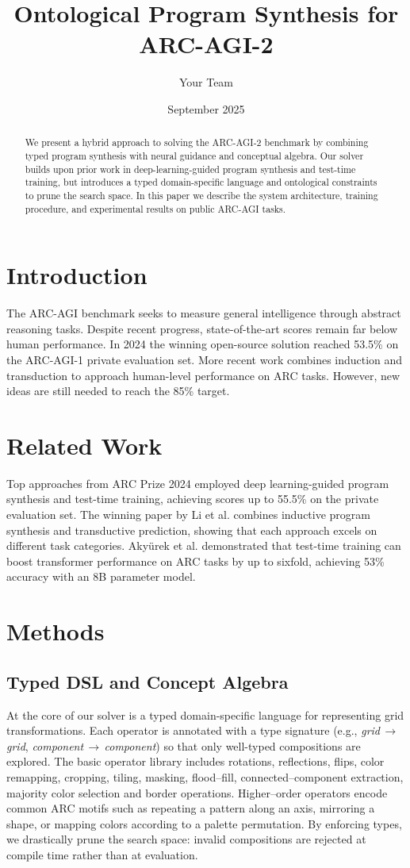 \documentclass{article}
\title{Ontological Program Synthesis for ARC-AGI-2}
\author{Your Team}
\date{September 2025}
\begin{document}
\maketitle
\begin{abstract}
We present a hybrid approach to solving the ARC-AGI-2 benchmark by combining typed program synthesis with neural guidance and conceptual algebra. Our solver builds upon prior work in deep-learning-guided program synthesis and test-time training, but introduces a typed domain-specific language and ontological constraints to prune the search space. In this paper we describe the system architecture, training procedure, and experimental results on public ARC-AGI tasks.
\end{abstract}
\section{Introduction}
The ARC-AGI benchmark seeks to measure general intelligence through abstract reasoning tasks. Despite recent progress, state-of-the-art scores remain far below human performance. In 2024 the winning open-source solution reached 53.5\% on the ARC-AGI-1 private evaluation set\cite{arc2024report}. More recent work combines induction and transduction to approach human-level performance on ARC tasks\cite{li2024combining}. However, new ideas are still needed to reach the 85\% target.
\section{Related Work}
Top approaches from ARC Prize 2024 employed deep learning-guided program synthesis and test-time training, achieving scores up to 55.5\% on the private evaluation set\cite{arc2024report}. The winning paper by Li et al. combines inductive program synthesis and transductive prediction, showing that each approach excels on different task categories\cite{li2024combining}. Akyürek et al. demonstrated that test-time training can boost transformer performance on ARC tasks by up to sixfold, achieving 53\% accuracy with an 8B parameter model\cite{akyurek2024ttt}.
\section{Methods}
\subsection{Typed DSL and Concept Algebra}
At the core of our solver is a typed domain-specific language for representing grid transformations.  Each operator is annotated with a type signature (e.g., \textit{grid\,$\rightarrow$\,grid}, \textit{component\,$\rightarrow$\,component}) so that only well-typed compositions are explored.  The basic operator library includes rotations, reflections, flips, color remapping, cropping, tiling, masking, flood--fill, connected--component extraction, majority color selection and border operations.  Higher--order operators encode common ARC motifs such as repeating a pattern along an axis, mirroring a shape, or mapping colors according to a palette permutation.  By enforcing types, we drastically prune the search space: invalid compositions are rejected at compile time rather than at evaluation.
\end{document}
